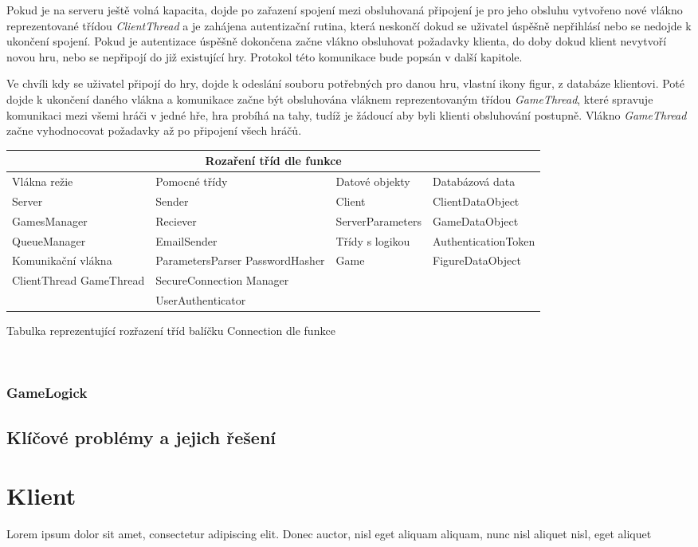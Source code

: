\documentclass[12pt]{article}
\begin{document}
Pokud je na serveru ještě volná kapacita, dojde po zařazení spojení mezi obsluhovaná připojení je pro jeho obsluhu vytvořeno nové vlákno reprezentované třídou \textit{ClientThread} a je zahájena autentizační rutina, která neskončí dokud se uživatel úspěšně nepřihlásí nebo se nedojde k ukončení spojení. Pokud je autentizace úspěšně dokončena začne vlákno obsluhovat požadavky klienta, do doby dokud klient nevytvoří novou hru, nebo se nepřipojí do již existující hry. Protokol této komunikace bude popsán v další kapitole.

Ve chvíli kdy se uživatel připojí do hry, dojde k odeslání souboru potřebných pro danou hru, vlastní ikony figur, z databáze klientovi. Poté dojde k ukončení daného vlákna a komunikace začne být obsluhována vláknem reprezentovaným třídou \textit{GameThread}, které spravuje komunikaci mezi všemi hráči v jedné hře, hra probíhá na tahy, tudíž je žádoucí aby byli klienti obsluhování postupně. Vlákno \textit{GameThread} začne vyhodnocovat požadavky až po připojení všech hráčů.\textit{} 

\begin{listing}[!ht]
\begin{tabular}{ |p{3cm}|p{}|p{}|p{4cm}| }
\hline
\multicolumn{4}{|c|}{Rozaření tříd dle funkce} \\
\hline
 Vlákna režie& Pomocné třídy & Datové objekty & Databázová data \\
\hline
Server & Sender &Client &ClientDataObject\\
GamesManager & Reciever  & ServerParameters &  GameDataObject\\
\cline{3-3} QueueManager&EmailSender& Třídy s logikou & AuthenticationToken   \\
\cline{1-1} \cline{3-3} Komunikační vlákna & ParametersParser PasswordHasher & Game & FigureDataObject \\
\cline{1-1} ClientThread GameThread& SecureConnection Manager& &\\
& UserAuthenticator & &\\
\hline
\end{tabular}
\caption{Tabulka reprezentující rozřazení tříd balíčku Connection dle funkce}
\end{listing}
\
\newpage
\subsubsection{GameLogick}
\newpage
\subsection{Klíčové problémy a jejich řešení}
\newpage
\section{Klient}
Lorem ipsum dolor sit amet, consectetur adipiscing elit. Donec auctor, nisl eget aliquam aliquam, nunc nisl aliquet nisl, eget aliquet
\newpage
\printbibliography[heading=bibintoc,title={Reference}]
\newpage
{}
\listoflistings
\end{document}
